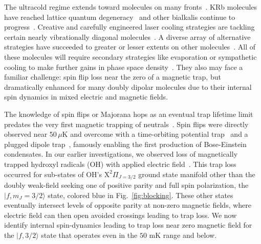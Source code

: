 \documentclass[%
 reprint,
groupedaddress,
 amsmath,amssymb,
 aps,
prl,
]{revtex4-1}
\begin{document}
%
%
The ultracold regime extends toward molecules on many fronts~\cite{Carr2009}. KRb molecules have reached lattice quantum degeneracy~\cite{Moses2015} and other bialkalis continue to progress~\cite{Takekoshi2014, Park2015}. Creative and carefully engineered laser cooling strategies are tackling certain nearly vibrationally diagonal molecules~\cite{Hummon2013, Barry2014, Zhelyazkova2014, Steinecker2016, Hemmerling2016}. A diverse array of alternative strategies have succeeded to greater or lesser extents on other molecules~\cite{Doyle1998, Bethlem1999, Bochinski2003, Narevicius2008, Wiederkehr2012, Prehn2016}. All of these molecules will require secondary strategies like evaporation or sympathetic cooling to make further gains in phase space density~\cite{Parazzoli2011, Stuhl2012evap, Quemener2016}. They also may face a familiar challenge: spin flip loss near the zero of a magnetic trap, but dramatically enhanced for many doubly dipolar molecules due to their internal spin dynamics in mixed electric and magnetic fields. 

The knowledge of spin flips or Majorana hops as an eventual trap lifetime limit predates the very first magnetic trapping of neutrals~\cite{Migdall1985}. Spin flips were directly observed near $50\,\mu\text{K}$ and overcome with a time-orbiting potential trap~\cite{Petrich1995} and a plugged dipole trap~\cite{Davis1995}, famously enabling the first production of Bose-Einstein condensates. In our earlier investigations, we observed loss of magnetically trapped hydroxyl radicals (OH) with applied electric field~\cite{Stuhl2012uwave}. This trap loss occurred for sub-states of OH's $\mathrm{X}^2\Pi_{J=3/2}$ ground state manifold other than the doubly weak-field seeking one of positive parity and full spin polarization, the $|f,m_J=3/2\rangle$ state, colored blue in Fig.~\ref{fig:blocking}. These other states eventually intersect levels of opposite parity at non-zero magnetic fields, where electric field can then open avoided crossings leading to trap loss. We now identify internal spin-dynamics leading to trap loss near zero magnetic field for the $|f,3/2\rangle$ state that operates even in the $50\text{ mK}$ range and below. 
\end{document}
